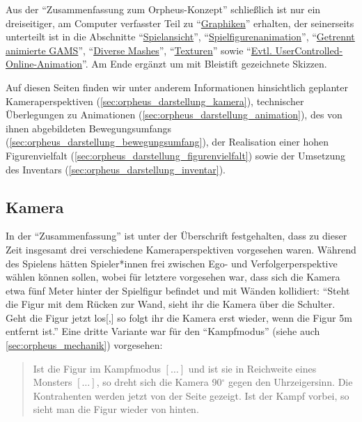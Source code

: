 \documentclass[a5paper,pagesize]{scrbook}
\begin{document}
Aus der \enquote{Zusammenfassung zum Orpheus-Konzept} schließlich ist nur ein dreiseitiger, am Computer verfasster Teil zu \enquote{\uline{Graphiken}}\autocite[Vgl.][]{orpheus_zusammenfassung_1996} erhalten, der seinerseits unterteilt ist in die Abschnitte \enquote{\uline{Spielansicht}}, \enquote{\uline{Spielfigurenanimation}}, \enquote{\uline{Getrennt animierte GAMS}}, \enquote{\uline{Diverse Mashes}}, \enquote{\uline{Texturen}} sowie \enquote{\uline{Evtl. User\-Controlled-Online-Animation}}.
Am Ende ergänzt um mit Bleistift gezeichnete Skizzen.

Auf diesen Seiten finden wir unter anderem Informationen hinsichtlich geplanter Kameraperspektiven (\autoref{sec:orpheus_darstellung_kamera}), technischer Überlegungen zu Animationen (\autoref{sec:orpheus_darstellung_animation}), des von ihnen abgebildeten Bewegungsumfangs (\autoref{sec:orpheus_darstellung_bewegungsumfang}), der Realisation einer hohen Figurenvielfalt (\autoref{sec:orpheus_darstellung_figurenvielfalt}) sowie der Umsetzung des Inventars (\autoref{sec:orpheus_darstellung_inventar}).


\subsection{Kamera}\label{sec:orpheus_darstellung_kamera}
In der \enquote{Zusammenfassung} ist unter der Überschrift festgehalten, dass zu dieser Zeit insgesamt drei verschiedene Kameraperspektiven vorgesehen waren.
Während des Spielens hätten Spieler*innen frei zwischen Ego- und Verfolgerperspektive wählen können sollen, wobei für letztere vorgesehen war, dass sich die Kamera etwa fünf Meter hinter der Spielfigur befindet und mit Wänden kollidiert:
\enquote{Steht die Figur mit dem Rücken zur Wand, sieht ihr die Kamera über die Schulter. Geht die Figur jetzt los[,] so folgt ihr die Kamera erst wieder, wenn die Figur 5m entfernt ist.}
Eine dritte Variante war für den \enquote{Kampfmodus} (siehe auch \autoref{sec:orpheus_mechanik}) vorgesehen:

\begin{quote}
Ist die Figur im Kampfmodus $[\dots]$ und ist sie in Reichweite eines Monsters $[\dots]$, so dreht sich die Kamera 90$^\circ$ gegen den Uhrzeigersinn. Die Kontrahenten werden jetzt von der Seite gezeigt. Ist der Kampf vorbei, so sieht man die Figur wieder von hinten.
\end{quote}
\end{document}
